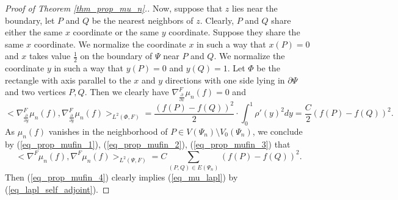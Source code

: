 \documentclass[12pt]{article}
\numberwithin{equation}{section}
\theoremstyle{theorem}
\theoremstyle{definition}
\theoremstyle{remark}
\newcommand{\scal}[2]{\big< #1, #2 \big>}
\begin{document}
\begin{proof}[Proof of Theorem  \ref{thm_prop_mu_n}.]
		\par Now, suppose that $z$ lies near the boundary, let $P$ and $Q$ be the nearest neighbors of $z$. 
		Clearly, $P$ and $Q$ share either the same $x$ coordinate or the same $y$ coordinate.
		Suppose they share the same $x$ coordinate.
		We normalize the coordinate $x$ in such a way that $x(P) = 0$ and $x$ takes value $\frac{1}{2}$ on the boundary of $\Psi$ near $P$ and $Q$. 
		We normalize the coordinate $y$ in such a way that $y(P) = 0$ and $y(Q) = 1$.
		Let $\Phi$ be the rectangle with axis parallel to the $x$ and $y$ directions with one side lying in $\partial \Psi$ and two vertices $P, Q$.
		Then we clearly have $\nabla_{\frac{\partial}{\partial x}}^{F} \mu_n(f) = 0$ and 
		\begin{equation}\label{eq_prop_mufin_3}
			\scal{\nabla_{\frac{\partial}{\partial y}}^{F} \mu_n(f)}{\nabla_{\frac{\partial}{\partial y}}^{F} \mu_n(f)}_{L^2(\Phi, F)} 
			= 
			\frac{(f(P) - f(Q))^2}{2} \cdot \int_{0}^{1} \rho'(y)^2 dy
			=
			\frac{C}{2}(f(P) - f(Q))^2.
		\end{equation}
		As $\mu_n(f)$ vanishes in the neighborhood of $P \in V(\Psi_n) \setminus V_0(\Psi_n)$, we conclude by (\ref{eq_prop_mufin_1}), (\ref{eq_prop_mufin_2}), (\ref{eq_prop_mufin_3}) that
		\begin{equation}\label{eq_prop_mufin_4}
			\scal{\nabla^{F} \mu_n(f)}{\nabla^{F}  \mu_n(f)}_{L^2(\Psi, F)}
			=
			C
			\sum_{(P, Q) \in E(\Psi_n)} (f(P) - f(Q))^2.
		\end{equation}
		Then (\ref{eq_prop_mufin_4}) clearly implies (\ref{eq_mu_lapl}) by (\ref{eq_lapl_self_adjoint}).
	\end{proof}

	
\end{document}
